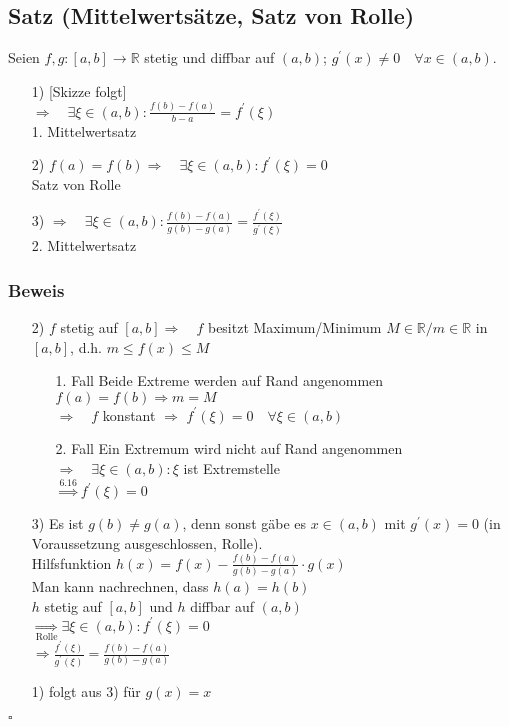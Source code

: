 \documentclass[12pt, titlepage]{article}
\newcommand{\R}{\mathds{R}}
\renewcommand{\>}{\rightarrow}
\renewcommand{\*}{\cdot}
\begin{document}
	\subsection{Satz (Mittelwertsätze, Satz von Rolle)}
	Seien $f,g\colon[a,b]\>\R$ stetig und diffbar auf $(a,b)$; $g^\prime(x)\neq0\quad\forall x\in(a,b)$.
	\begin{itemize}
		\item[1)] [Skizze folgt]\\
		$\Rightarrow\quad\exists\xi\in(a,b)\colon\frac{f(b)-f(a)}{b-a}=f^\prime(\xi)$\\
		1. Mittelwertsatz
		\item[2)] $f(a)=f(b)\Rightarrow \quad\exists\xi\in(a,b)\colon f^\prime(\xi)=0$\\
		Satz von Rolle
		\item[3)] $\Rightarrow \quad\exists\xi\in(a,b)\colon\frac{f(b)-f(a)}{g(b)-g(a)}=\frac{f^\prime(\xi)}{g^\prime(\xi)}$\\
		2. Mittelwertsatz
	\end{itemize}
	\subsubsection*{Beweis}
	\begin{itemize}
		\item[2)] $f$ stetig auf $[a,b]\Rightarrow\quad f$ besitzt Maximum/Minimum $M\in\R/m\in\R$ in $[a,b]$, d.h. $m\leq f(x)\leq M$
		\begin{itemize}
			\item[1. Fall] Beide Extreme werden auf Rand angenommen\\
			$f(a)=f(b)\Rightarrow m=M$\\
			$\Rightarrow\quad f$ konstant $\Rightarrow$ $f^\prime(\xi)=0\quad\forall\xi\in(a,b)$
			\item[2. Fall] Ein Extremum wird nicht auf Rand angenommen\\
			$\Rightarrow\quad\exists\xi\in(a,b)\colon\xi$ ist Extremstelle\\
			$\overset{\textrm{6.16}}{\Rightarrow}f^\prime(\xi)=0$
		\end{itemize} 
		\item[3)] Es ist $g(b)\neq g(a)$, denn sonst gäbe es $x\in(a,b)$ mit $g^\prime(x)=0$ (in Voraussetzung ausgeschlossen, Rolle).\\
		Hilfsfunktion $h(x)=f(x)-\frac{f(b)-f(a)}{g(b)-g(a)}\*g(x)$\\
		Man kann nachrechnen, dass $h(a)=h(b)$\\
		$h$ stetig auf $[a,b]$ und $h$ diffbar auf $(a,b)$\\
		$\underset{\textrm{Rolle}}{\Rightarrow}\exists\xi\in(a,b)\colon f^\prime(\xi)=0$\\
		$\Rightarrow \frac{f^\prime(\xi)}{g^\prime(\xi)}=\frac{f(b)-f(a)}{g(b)-g(a)}$
		\item[1)] folgt aus 3) für $g(x)=x$
	\end{itemize}
	\hfill$\square$
\end{document}
